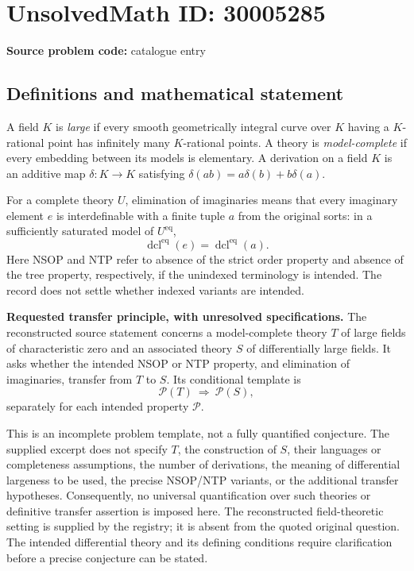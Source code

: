 \documentclass[11pt]{article}
\begin{document}
\section*{UnsolvedMath ID: 30005285}
\textbf{Source problem code:} catalogue entry
\subsection{Definitions and mathematical statement}
A field \(K\) is \emph{large} if every smooth geometrically integral curve over \(K\) having a \(K\)-rational point has infinitely many \(K\)-rational points. A theory is \emph{model-complete} if every embedding between its models is elementary. A derivation on a field \(K\) is an additive map \(\delta:K\to K\) satisfying \(\delta(ab)=a\delta(b)+b\delta(a)\).

For a complete theory \(U\), elimination of imaginaries means that every imaginary element \(e\) is interdefinable with a finite tuple \(a\) from the original sorts: in a sufficiently saturated model of \(U^{\mathrm{eq}}\),
\[
\operatorname{dcl}^{\mathrm{eq}}(e)=\operatorname{dcl}^{\mathrm{eq}}(a).
\]
Here NSOP and NTP refer to absence of the strict order property and absence of the tree property, respectively, if the unindexed terminology is intended. The record does not settle whether indexed variants are intended.

\textbf{Requested transfer principle, with unresolved specifications.} The reconstructed source statement concerns a model-complete theory \(T\) of large fields of characteristic zero and an associated theory \(S\) of differentially large fields. It asks whether the intended NSOP or NTP property, and elimination of imaginaries, transfer from \(T\) to \(S\). Its conditional template is
\[
\mathcal P(T)\ \Longrightarrow\ \mathcal P(S),
\]
separately for each intended property \(\mathcal P\).

This is an incomplete problem template, not a fully quantified conjecture. The supplied excerpt does not specify \(T\), the construction of \(S\), their languages or completeness assumptions, the number of derivations, the meaning of differential largeness to be used, the precise NSOP/NTP variants, or the additional transfer hypotheses. Consequently, no universal quantification over such theories or definitive transfer assertion is imposed here. The reconstructed field-theoretic setting is supplied by the registry; it is absent from the quoted original question. The intended differential theory and its defining conditions require clarification before a precise conjecture can be stated.
\end{document}
